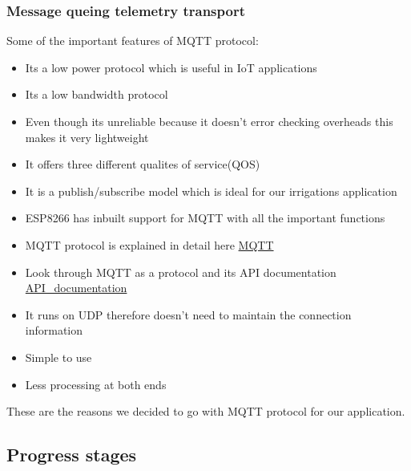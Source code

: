 \documentclass[16pt]{article}
\begin{document}
\vspace{0.5cm}

\subsubsection{Message queing telemetry transport}

\vspace{0.5cm}
Some of the important features of MQTT protocol:

\begin{itemize}

\item
  Its a low power protocol which is useful in IoT applications
\item
  Its a low bandwidth protocol
\item
  Even though its unreliable because it doesn't error checking overheads
  this makes it very lightweight
\item
  It offers three different qualites of service(QOS)
\item
  It is a publish/subscribe model which is ideal for our irrigations
  application
\item
  ESP8266 has inbuilt support for MQTT with all the important functions
\item
  MQTT protocol is explained in detail here
  {\color{red}\href{http://mosquitto.org/man/mqtt-7.html}{MQTT}}
\item
  Look through MQTT as a protocol and its API documentation
  {\color{red}\href{http://knolleary.net/arduino-client-for-mqtt/api/}{API\_documentation}}
\item
  It runs on UDP therefore doesn't need to maintain the connection
  information
\item
  Simple to use
\item
  Less processing at both ends
\end{itemize}

These are the reasons we decided to go with MQTT protocol for our
application.



\subsection{Progress stages}
\end{document}
